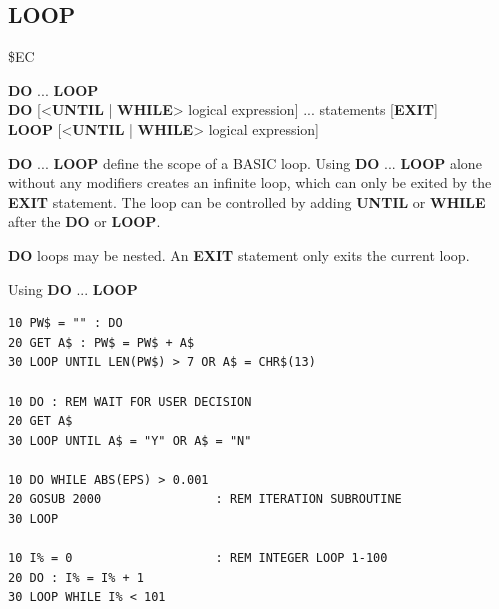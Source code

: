 
\newpage
\subsection{LOOP}
\begin{description}[leftmargin=2cm,style=nextline]
\item [Token:]    \$EC

\item [Format:]   {\bf DO} ... {\bf LOOP} \\
                  {\bf DO} [<{\bf UNTIL} | {\bf WHILE}> logical expression] ... statements [{\bf EXIT}] \\
                  {\bf LOOP} [<{\bf UNTIL} | {\bf WHILE}> logical expression]

\item [Usage:]    {\bf DO} ... {\bf LOOP} define the scope of a BASIC loop. Using {\bf DO} ... {\bf LOOP} alone without any modifiers creates an infinite loop, which can only be exited by the {\bf EXIT} statement. The loop can be controlled by adding {\bf UNTIL} or {\bf WHILE} after the {\bf DO} or {\bf LOOP}.

\item [Remarks:]  {\bf DO} loops may be nested. An {\bf EXIT} statement only exits the current loop.

\item [Examples:] Using {\bf DO} ... {\bf LOOP}

\begin{tcolorbox}[colback=black,coltext=white]
\verbatimfont{\codefont}
\begin{verbatim}
10 PW$ = "" : DO
20 GET A$ : PW$ = PW$ + A$
30 LOOP UNTIL LEN(PW$) > 7 OR A$ = CHR$(13)

10 DO : REM WAIT FOR USER DECISION
20 GET A$
30 LOOP UNTIL A$ = "Y" OR A$ = "N"

10 DO WHILE ABS(EPS) > 0.001
20 GOSUB 2000                : REM ITERATION SUBROUTINE
30 LOOP

10 I% = 0                    : REM INTEGER LOOP 1-100
20 DO : I% = I% + 1
30 LOOP WHILE I% < 101
\end{verbatim}
\end{tcolorbox}
\end{description}


\newpage
